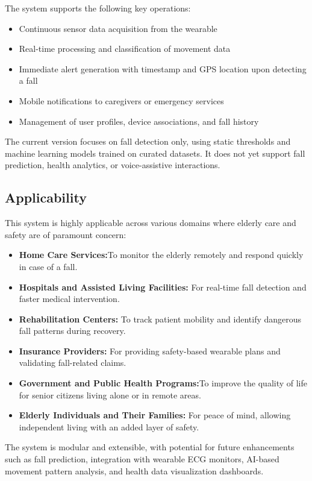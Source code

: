 \documentclass[a4paper, 12pt]{report}
\begin{document}
The system supports the following key operations:

\begin{itemize}[itemsep=-4pt]
    \item Continuous sensor data acquisition from the wearable

    \item Real-time processing and classification of movement data

    \item Immediate alert generation with timestamp and GPS location upon detecting a fall

    \item Mobile notifications to caregivers or emergency services
    
    \item Management of user profiles, device associations, and fall history
\end{itemize}
The current version focuses on fall detection only, using static thresholds and machine learning models trained on curated datasets. It does not yet support fall prediction, health analytics, or voice-assistive interactions.

\subsection{Applicability}
This system is highly applicable across various domains where elderly care and safety are of paramount concern:
\begin{itemize}[itemsep=-4pt]
    \item \textbf{Home Care Services:}To monitor the elderly remotely and respond quickly in case of a fall.

    \item \textbf{Hospitals and Assisted Living Facilities: } For real-time fall detection and faster medical intervention.
    
    \item \textbf{Rehabilitation Centers:} To track patient mobility and identify dangerous fall patterns during recovery.

    \item \textbf{Insurance Providers:}  For providing safety-based wearable plans and validating fall-related claims.

    \item \textbf{Government and Public Health Programs:}To improve the quality of life for senior citizens living alone or in remote areas.

    \item \textbf{Elderly Individuals and Their Families:}  For peace of mind, allowing independent living with an added layer of safety.
\end{itemize}
The system is modular and extensible, with potential for future enhancements such as fall prediction, integration with wearable ECG monitors, AI-based movement pattern analysis, and health data visualization dashboards.
\end{document}
